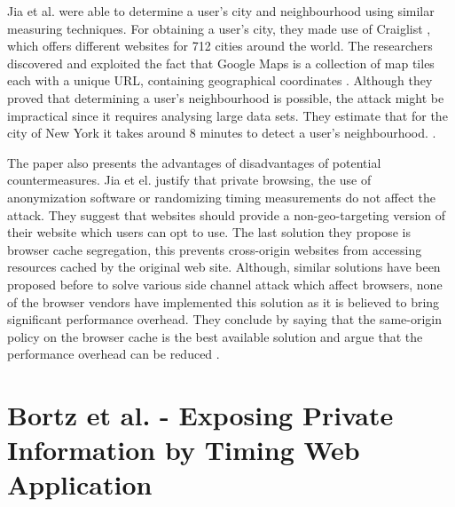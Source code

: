 \documentclass[10pt,a4paper,twoside]{book}
\begin{document}
Jia et al. were able to determine a user's city and neighbourhood using similar measuring techniques. For obtaining a user's city, they made use of Craiglist \cite{craiglist}, which offers different websites for 712 cities around the world. The researchers discovered and exploited the fact that Google Maps is a collection of map tiles each with a unique URL, containing geographical coordinates \cite{jia2015know}. Although they proved that determining a user's neighbourhood is possible, the attack might be impractical since it requires analysing large data sets. They estimate that for the city of New York it takes around 8 minutes to detect a user's neighbourhood. \cite{jia2015know}.

The paper also presents the advantages of disadvantages of potential countermeasures. Jia et el. justify that private browsing, the use of anonymization software or randomizing timing measurements do not affect the attack. They suggest that websites should provide a non-geo-targeting version of their website which users can opt to use. The last solution they propose is browser cache segregation, this prevents cross-origin websites from accessing resources cached by the original web site. Although, similar solutions have been proposed before to solve various side channel attack which affect browsers, none of the browser vendors have implemented this solution as it is believed to bring significant performance overhead. They conclude by saying that the same-origin policy on the browser cache is the best available solution and argue that the performance overhead can be reduced \cite{jia2015know}.


\section{Bortz et al. - Exposing Private Information by Timing Web Application}
\label{bortz}
\end{document}
